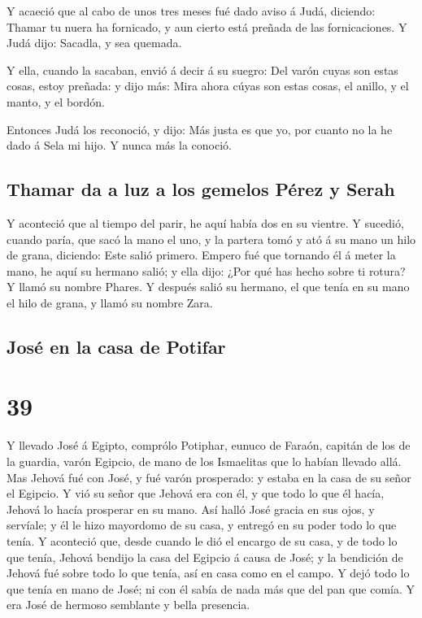  Y acaeció que al cabo de unos tres meses fué dado aviso á
Judá, diciendo: Thamar tu nuera ha fornicado, y aun cierto está preñada
de las fornicaciones. Y Judá dijo: Sacadla, y sea quemada.

 Y ella, cuando la sacaban, envió á decir á su suegro: Del
varón cuyas son estas cosas, estoy preñada: y dijo más: Mira ahora cúyas
son estas cosas, el anillo, y el manto, y el bordón.

 Entonces Judá los reconoció, y dijo: Más justa es que yo,
por cuanto no la he dado á Sela mi hijo. Y nunca más la conoció.

\hypertarget{thamar-da-a-luz-a-los-gemelos-puxe9rez-y-serah}{%
\subsection{Thamar da a luz a los gemelos Pérez y
Serah}\label{thamar-da-a-luz-a-los-gemelos-puxe9rez-y-serah}}

 Y aconteció que al tiempo del parir, he aquí había dos en
su vientre.  Y sucedió, cuando paría, que sacó la mano el
uno, y la partera tomó y ató á su mano un hilo de grana, diciendo: Este
salió primero.  Empero fué que tornando él á meter la mano,
he aquí su hermano salió; y ella dijo: ¿Por qué has hecho sobre ti
rotura? Y llamó su nombre Phares.  Y después salió su
hermano, el que tenía en su mano el hilo de grana, y llamó su nombre
Zara.

\hypertarget{josuxe9-en-la-casa-de-potifar}{%
\subsection{José en la casa de
Potifar}\label{josuxe9-en-la-casa-de-potifar}}

\hypertarget{section-38}{%
\section{39}\label{section-38}}

 Y llevado José á Egipto, comprólo Potiphar, eunuco de
Faraón, capitán de los de la guardia, varón Egipcio, de mano de los
Ismaelitas que lo habían llevado allá.  Mas Jehová fué con
José, y fué varón prosperado: y estaba en la casa de su señor el
Egipcio.  Y vió su señor que Jehová era con él, y que todo
lo que él hacía, Jehová lo hacía prosperar en su mano.  Así
halló José gracia en sus ojos, y servíale; y él le hizo mayordomo de su
casa, y entregó en su poder todo lo que tenía.  Y aconteció
que, desde cuando le dió el encargo de su casa, y de todo lo que tenía,
Jehová bendijo la casa del Egipcio á causa de José; y la bendición de
Jehová fué sobre todo lo que tenía, así en casa como en el campo.
 Y dejó todo lo que tenía en mano de José; ni con él sabía
de nada más que del pan que comía. Y era José de hermoso semblante y
bella presencia.


